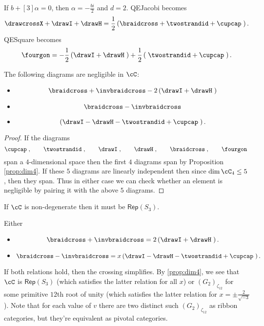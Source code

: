 \documentclass[12pt]{amsart}
\begin{document}
If $b+[3]\alpha = 0$, then $\alpha = -\frac{bi}{2}$ and $d = 2$.  QEJacobi becomes
$$\drawcrossX + \drawI + \drawH = \frac{1}{2} \left(\braidcross + \twostrandid + \cupcap \;\right).$$
QESquare becomes
$$\fourgon = -\frac{1}{2} \left(\drawI + \drawH \;\right) + \frac{1}{2} \left(\;\twostrandid + \cupcap \;\right).$$

\begin{lemma}
The following diagrams are negligible in $\cC$:
\begin{itemize}
\item $$\braidcross + \invbraidcross - 2 \left(\drawI + \drawH \;\right)$$
\item $$\braidcross - \invbraidcross$$
\item $$\left(\drawI - \drawH - \twostrandid + \cupcap\;\right).$$
\end{itemize}
\end{lemma}
\begin{proof}
If the diagrams
  \[
  \cupcap\;,\qquad\twostrandid\;,
    \qquad\drawI\;,\qquad\drawH\;,\qquad\braidcross\;,\qquad\fourgon\;
   \]
 span a $4$-dimensional space then the first $4$ diagrams span by Proposition \ref{prop:dim4}.  If these $5$ diagrams are linearly independent then since $\dim \cC_4 \leq 5$, then they span.  Thus in either case we can check whether an element is negligible by pairing it with the above $5$ diagrams.
\end{proof}

\begin{corollary}
If $\cC$ is non-degenerate then it must be $\mathsf{Rep}(S_3)$.
\end{corollary}

\begin{corollary}
Either
\begin{itemize}
\item $$\braidcross + \invbraidcross = 2 \left(\drawI + \drawH \;\right).$$
\item $$\braidcross - \invbraidcross = x \left(\drawI - \drawH - \twostrandid + \cupcap\;\right).$$
\end{itemize}
\end{corollary}

If both relations hold, then the crossing simplifies.  By \ref{prop:dim4}, we
see that $\cC$ is $\mathsf{Rep}(S_3)$ (which satisfies the latter relation for
all $x$) or $(G_2)_{\zeta_{12}}$ for some primitive $12$th root of unity
(which satisfies the latter relation for $x = \pm \frac{2}{\sqrt{-3}}$). Note
that for each value of $v$ there are two distinct such $(G_2)_{\zeta_{12}}$ as
ribbon categories, but they're equivalent as pivotal categories.
\end{document}
